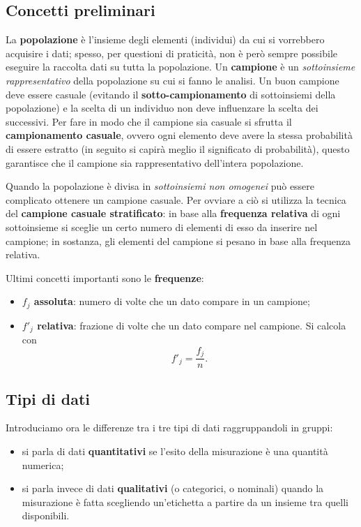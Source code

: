 \subsection{Concetti preliminari}
La \textbf{popolazione} è l'insieme degli elementi (individui) da cui si vorrebbero acquisire i dati; spesso, per questioni di praticità, non è però sempre possibile eseguire la raccolta dati su tutta la popolazione. 
\newline
\noindent Un \textbf{campione} è un \textit{sottoinsieme rappresentativo} della popolazione su cui si fanno le analisi.
Un buon campione deve essere casuale (evitando il \textbf{sotto-campionamento} di sottoinsiemi della popolazione) e la scelta di un individuo non deve influenzare la scelta dei successivi.
Per fare in modo che il campione sia casuale si sfrutta il \textbf{campionamento casuale}, ovvero ogni elemento deve avere la stessa probabilità di essere estratto (in seguito si capirà meglio il significato di probabilità), questo garantisce che il campione sia rappresentativo dell'intera popolazione.

\noindent Quando la popolazione è divisa in \textit{sottoinsiemi non omogenei} può essere complicato ottenere un campione casuale. Per ovviare a ciò si utilizza la tecnica del \textbf{campione casuale stratificato}: in base alla \textbf{frequenza relativa} di ogni sottoinsieme si sceglie un certo numero di elementi di esso da inserire nel campione; in sostanza, gli elementi del campione si pesano in base alla frequenza relativa.

\noindent Ultimi concetti importanti sono le \textbf{frequenze}: 
\begin{itemize}
    \item \textbf{$f_j$ assoluta}: numero di volte che un dato compare in un campione;
    \item \textbf{$f'_j$ relativa}: frazione di volte che un dato compare nel campione. Si calcola con 
    \setlength\abovedisplayskip{3pt} \[
        f'_j = \frac{f_j}{n}.
    \]
\end{itemize}

\subsection{Tipi di dati}
Introduciamo ora le differenze tra i tre tipi di dati raggruppandoli in gruppi: 
\begin{itemize}
    \item si parla di dati \textbf{quantitativi} se l’esito della misurazione è una quantità numerica;
    \item si parla invece di dati \textbf{qualitativi} (o categorici, o nominali) quando la misurazione è fatta scegliendo un’etichetta a partire da un insieme tra quelli disponibili.
\end{itemize}

